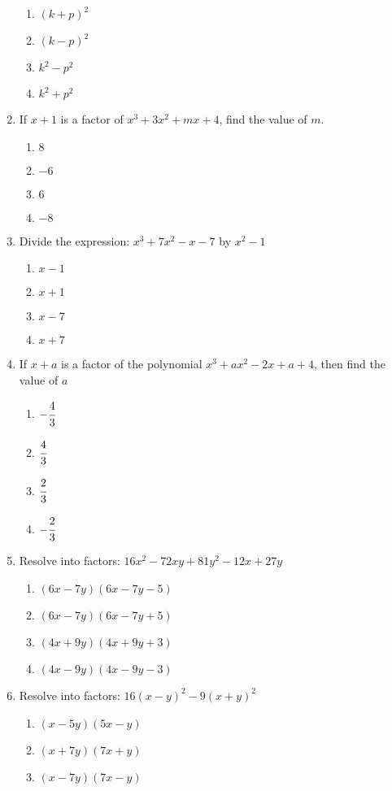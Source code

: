\begin{multicols}{2}
\begin{enumerate}[label={\arabic*.}]
\begin{enumerate}[label={\Alph*.}]
	\item \((k+p)^2\)
	\item \((k-p)^2\)
	\item \(k^2 - p^2\)
	\item \(k^2 + p^2\)
	\end{enumerate}
\item If $x+1$ is a factor of $x^3 + 3x^2 + mx + 4$, find the value of $m$. 
	\begin{enumerate}[label={\Alph*.}]
	\item \(8\)
	\item \(-6\)
	\item \(6\)
	\item \(-8\)
	\end{enumerate}
\item Divide the expression: $x^3 + 7x^2 -x - 7$ by $x^2-1$
	\begin{enumerate}[label={\Alph*.}]
	\item \(x-1\)
	\item \(x+1\)
	\item \(x-7\)
	\item \(x+7\)
	\end{enumerate}
\item If $x+a$ is a factor of the polynomial $x^3 +ax^2 -2x +a + 4$, then find the value of $a$
	\begin{enumerate}[label={\Alph*.}]
	\item \(-\cfrac{4}{3}\)
	\item \(\cfrac{4}{3}\)
	\item \(\cfrac{2}{3}\)
	\item \(-\cfrac{2}{3}\)
	\end{enumerate}
\item Resolve into factors: $16x^2 - 72xy + 81y^2 - 12x + 27y$
	\begin{enumerate}[label={\Alph*.}]
	\item \((6x -7y)(6x - 7y -5)\)
	\item \((6x -7y)(6x - 7y +5)\)
	\item \((4x + 9y)(4x + 9y + 3)\)
	\item \((4x - 9y)(4x - 9y - 3)\)
	\end{enumerate}
\item Resolve into factors: $16(x-y)^2 - 9(x+y)^2$
	\begin{enumerate}[label={\Alph*.}]
	\item \((x-5y)(5x -y)\)
	\item \((x+7y)(7x + y)\)
	\item \((x-7y)(7x-y)\)

\end{enumerate}
\end{enumerate}
\end{multicols}
